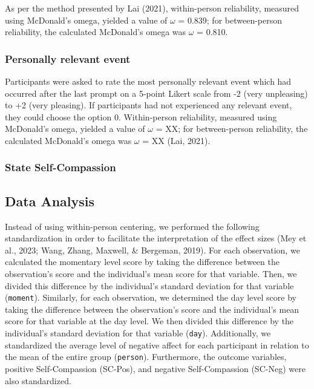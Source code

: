 \documentclass[
  man,floatsintext]{apa6}
\begin{document}
As per the method presented by Lai (2021), within-person reliability, measured using McDonald's omega, yielded a value of \(\omega\) = 0.839; for between-person reliability, the calculated McDonald's omega was \(\omega\) = 0.810.

\hypertarget{personally-relevant-event}{%
\subsubsection{Personally relevant event}\label{personally-relevant-event}}

Participants were asked to rate the most personally relevant event which had occurred after the last prompt on a 5-point Likert scale from -2 (very unpleasing) to +2 (very pleasing). If participants had not experienced any relevant event, they could choose the option 0. Within-person reliability, measured using McDonald's omega, yielded a value of \(\omega\) = XX; for between-person reliability, the calculated McDonald's omega was \(\omega\) = XX (Lai, 2021).

\hypertarget{state-self-compassion}{%
\subsubsection{State Self-Compassion}\label{state-self-compassion}}

\hypertarget{data-analysis-1}{%
\subsection{Data Analysis}\label{data-analysis-1}}

Instead of using within-person centering, we performed the following standardization in order to facilitate the interpretation of the effect sizes (Mey et al., 2023; Wang, Zhang, Maxwell, \& Bergeman, 2019). For each observation, we calculated the momentary level score by taking the difference between the observation's score and the individual's mean score for that variable. Then, we divided this difference by the individual's standard deviation for that variable (\texttt{moment}). Similarly, for each observation, we determined the day level score by taking the difference between the observation's score and the individual's mean score for that variable at the day level. We then divided this difference by the individual's standard deviation for that variable (\texttt{day}). Additionally, we standardized the average level of negative affect for each participant in relation to the mean of the entire group (\texttt{person}). Furthermore, the outcome variables, positive Self-Compassion (SC-Pos), and negative Self-Compassion (SC-Neg) were also standardized.
\end{document}
